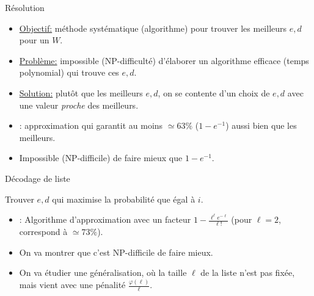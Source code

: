 \documentclass{beamer}
\theoremstyle{definition}
\theoremstyle{remark}
\begin{document}
\begin{frame}{Résolution \cite{BF18}}
  \begin{itemize}
  \item \underline{Objectif:} méthode systématique (algorithme) pour trouver les meilleurs $e,d$ pour un $W$.
    \pause
  \item \underline{Problème:} impossible (\textrm{NP}-difficulté) d'élaborer un algorithme efficace (temps polynomial) qui trouve ces $e,d$.
    \bigskip
    \pause
  \item \underline{Solution:} plutôt que les meilleurs $e,d$, on se contente d'un choix de $e,d$ avec une valeur \emph{proche} des meilleurs.
    
    \pause
    \bigskip

  \item \cite{BF18}: approximation qui garantit au moins $\simeq 63\%$ ($1-e^{-1}$) aussi bien que les meilleurs.
  \item Impossible (\textrm{NP}-difficile) de faire mieux que $1-e^{-1}$.
  \end{itemize}
\end{frame}

\begin{frame}{Décodage de liste}
  \begin{center}

    \bigskip
    Trouver $e,d$ qui maximise la probabilité que  égal à \alert{$i$}.
  \end{center}
  
  \pause\pause\pause
  
  \begin{itemize}
  \item \cite{BFGG20}: Algorithme d'approximation avec un facteur $1-\frac{\ell^{\ell}e^{-\ell}}{\ell!}$ (pour $\ell=2$, correspond à $\simeq 73\%$).
    \pause
  \item On va montrer que c'est \textrm{NP}-difficile de faire mieux.
    \pause
  \item On va étudier une généralisation, où la taille $\ell$ de la liste n'est pas fixée, mais vient avec une pénalité $\frac{\varphi(\ell)}{\ell}$.
  \end{itemize}
\end{frame}
\end{document}
